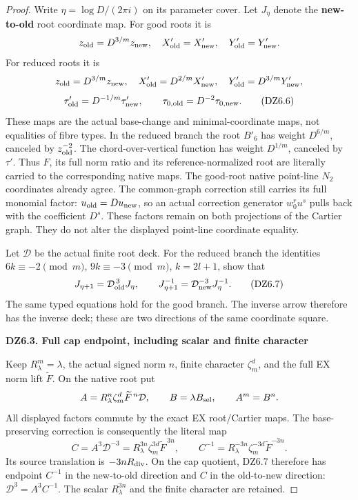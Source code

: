 \begin{proof}
Write \(\eta=\log D/(2\pi i)\) on its parameter cover.
Let \(J_\eta\) denote the \textbf{new-to-old} root coordinate map.
For good roots it is
\[
 z_{\rm old}=D^{3/m}z_{\rm new},\quad
 X'_{\rm old}=X'_{\rm new},\quad Y'_{\rm old}=Y'_{\rm new}.
\]
For reduced roots it is
\[
 z_{\rm old}=D^{3/m}z_{\rm new},\quad
 X'_{\rm old}=D^{2/m}X'_{\rm new},\quad
 Y'_{\rm old}=D^{3/m}Y'_{\rm new},
\]
\[
 \tau'_{\rm old}=D^{-1/m}\tau'_{\rm new},\qquad
 \tau_{0,\rm old}=D^{-2}\tau_{0,\rm new}.
 \tag{DZ6.6}
\]
These maps are the actual base-change and minimal-coordinate maps,
not equalities of fibre types. In the reduced branch the root
\(B'_6\) has weight \(D^{6/m}\), canceled by
\(z_{\rm old}^{-2}\). The chord-over-vertical function has
weight \(D^{1/m}\), canceled by \(\tau'\). Thus
\(F\), its full norm ratio and its reference-normalized root
are literally carried to the corresponding native maps.
The good-root native point-line \(N_2\) coordinates already
agree. The common-graph correction still carries its full
monomial factor: \(u_{\rm old}=D u_{\rm new}\), so an
actual correction generator \(w_0^r u^s\) pulls back with
the coefficient \(D^s\). These factors remain on both
projections of the Cartier graph. They do not alter the
displayed point-line coordinate equality.

Let \(\mathcal D\) be the actual finite root deck. For the
reduced branch the identities \(6k\equiv-2\pmod m\),
\(9k\equiv-3\pmod m\), \(k=2l+1\), show that
\[
 J_{\eta+1}=\mathcal D_{\rm old}^{\,3}J_\eta,
 \qquad J_{\eta+1}^{-1}
       =\mathcal D_{\rm new}^{-3}J_\eta^{-1}.
 \tag{DZ6.7}
\]
The same typed equations hold for the good branch. The inverse
arrow therefore has the inverse deck; these are two directions
of the same coordinate square.

\par

\medskip\noindent\textbf{DZ6.3. Full cap endpoint, including scalar and finite character}

\par\nobreak

Keep \(R_\lambda^m=\lambda\), the actual signed norm \(n\),
finite character \(\zeta_m^d\), and the full EX norm lift
\(\widetilde F\). On the native root put
\[
 A=R_\lambda^n\zeta_m^d\widetilde F^{\,n}\mathcal D,
 \qquad B=\lambda B_{\rm sel},\qquad A^m=B^n.
\]
All displayed factors commute by the exact EX root/Cartier maps.
The base-preserving correction is consequently the literal map
\[
 C=A^3\mathcal D^{-3}
    =R_\lambda^{3n}\zeta_m^{3d}\widetilde F^{\,3n},
 \qquad
 C^{-1}=R_\lambda^{-3n}\zeta_m^{-3d}\widetilde F^{-3n}.
 \tag{DZ6.8}
\]
Its source translation is \(-3nR_{\rm div}\). On the cap
quotient, DZ6.7 therefore has endpoint \(C^{-1}\) in the
new-to-old direction and \(C\) in the old-to-new direction:
\(\mathcal D^3=A^3C^{-1}\). The scalar
\(R_\lambda^{3n}\) and the finite character are retained.


\end{proof}
